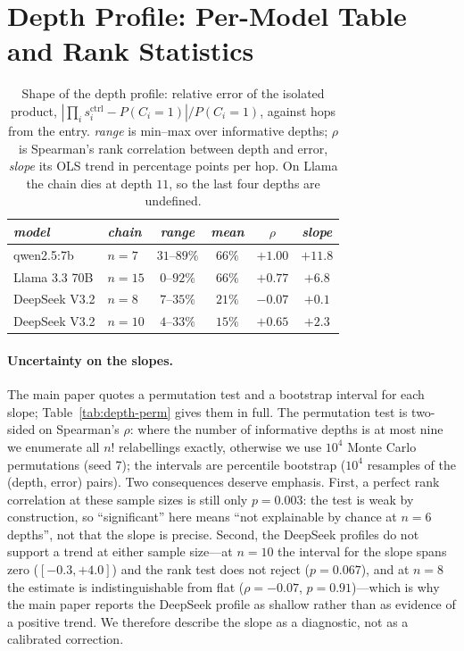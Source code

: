 \documentclass[sigconf,anonymous]{aamas}
\newcommand{\scite}[1]{\ensuremath{s^{\mathrm{ctrl}}_{#1}}}
\begin{document}
\section{Depth Profile: Per-Model Table and Rank Statistics}
\label{app:depth}

\begin{table}[h]
\small
\centering
\caption{Shape of the depth profile: relative error of the isolated product,
$|\prod_i \scite{i} - P(C_i{=}1)| / P(C_i{=}1)$, against hops from the entry.
\emph{range} is min--max over informative depths; $\rho$ is Spearman's rank
correlation between depth and error, \emph{slope} its OLS trend in percentage points
per hop. On Llama the chain dies at depth $11$, so the last four depths are
undefined.}
\vspace{6pt}
\label{tab:depth}
\begin{tabular}{llcccc}
\toprule
\textit{model} & \textit{chain} & \textit{range} & \textit{mean} & \textit{$\rho$}
& \textit{slope} \\
\midrule
qwen2.5:7b     & $n = 7$  & $31$--$89\%$ & $66\%$ & $+1.00$ & $+11.8$ \\
Llama 3.3 70B  & $n = 15$ & $0$--$92\%$  & $66\%$ & $+0.77$ & $+6.8$  \\
DeepSeek V3.2  & $n = 8$  & $7$--$35\%$  & $21\%$ & $-0.07$ & $+0.1$  \\
DeepSeek V3.2  & $n = 10$ & $4$--$33\%$  & $15\%$ & $+0.65$ & $+2.3$  \\
\bottomrule
\end{tabular}
\end{table}

\paragraph{Uncertainty on the slopes.} The main paper quotes a permutation test and a
bootstrap interval for each slope; Table~\ref{tab:depth-perm} gives them in full. The
permutation test is two-sided on Spearman's $\rho$: where the number of informative
depths is at most nine we enumerate all $n!$ relabellings exactly, otherwise we use
$10^4$ Monte Carlo permutations (seed 7); the intervals are percentile bootstrap
($10^4$ resamples of the (depth, error) pairs). Two consequences deserve emphasis.
First, a perfect rank correlation at these sample sizes is still only
$p = 0.003$: the test is weak by construction, so ``significant'' here means ``not
explainable by chance at $n = 6$ depths'', not that the slope is precise. Second, the
DeepSeek profiles do not support a trend at either sample size---at $n = 10$ the
interval for the slope spans zero ($[-0.3, +4.0]$) and the rank test does not reject
($p = 0.067$), and at $n = 8$ the estimate is indistinguishable from flat
($\rho = -0.07$, $p = 0.91$)---which is why the main paper reports the DeepSeek profile
as shallow rather than as evidence of a positive trend. We therefore describe the
slope as a diagnostic, not as a calibrated correction.
\end{document}
